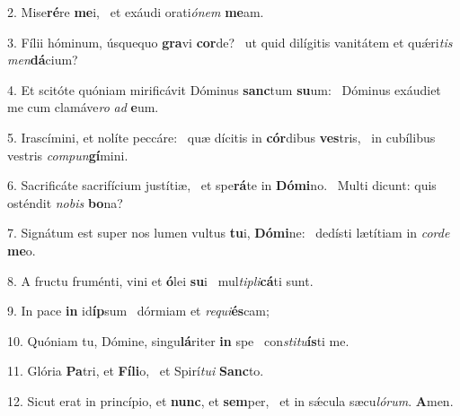 2. Mise\textbf{ré}re \textbf{me}i, \ast\  et exáudi orati\textit{ó}\textit{nem} \textbf{me}am.\

3. Fílii hóminum, úsquequo \textbf{gra}vi \textbf{cor}de? \ast\  ut quid dilígitis vanitátem et quǽri\textit{tis} \textit{men}\textbf{dá}cium?\

4. Et scitóte quóniam mirificávit Dóminus \textbf{sanc}tum \textbf{su}um: \ast\  Dóminus exáudiet me cum clamáve\textit{ro} \textit{ad} \textbf{e}um.\

5. Irascímini, et nolíte peccáre: \dag\  quæ dícitis in \textbf{cór}dibus \textbf{ves}tris, \ast\  in cubílibus vestris \textit{com}\textit{pun}\textbf{gí}mini.\

6. Sacrificáte sacrifícium justítiæ, \dag\  et spe\textbf{rá}te in \textbf{Dó}\textbf{mi}no. \ast\  Multi dicunt: quis osténdit \textit{no}\textit{bis} \textbf{bo}na?\

7. Signátum est super nos lumen vultus \textbf{tu}i, \textbf{Dó}\textbf{mi}ne: \ast\  dedísti lætítiam in \textit{cor}\textit{de} \textbf{me}o.\

8. A fructu fruménti, vini et \textbf{ó}lei \textbf{su}i \ast\  mul\textit{ti}\textit{pli}\textbf{cá}ti sunt.\

9. In pace \textbf{in} id\textbf{íp}sum \ast\  dórmiam et \textit{re}\textit{qui}\textbf{és}cam;\

10. Quóniam tu, Dómine, singu\textbf{lá}riter \textbf{in} spe \ast\  con\textit{sti}\textit{tu}\textbf{ís}ti me.\

11. Glória \textbf{Pa}tri, et \textbf{Fí}\textbf{li}o, \ast\  et Spirí\textit{tu}\textit{i} \textbf{Sanc}to.\

12. Sicut erat in princípio, et \textbf{nunc}, et \textbf{sem}per, \ast\  et in sǽcula sæcu\textit{ló}\textit{rum}. \textbf{A}men.\

